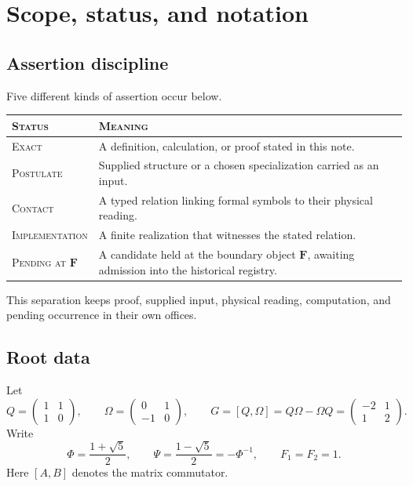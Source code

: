 \documentclass[10pt]{article}
\theoremstyle{remark}
\newcommand{\exact}{\textsc{Exact}}
\newcommand{\postulate}{\textsc{Postulate}}
\newcommand{\interface}{\textsc{Contact}}
\newcommand{\implementation}{\textsc{Implementation}}
\newcommand{\pending}{\textsc{Pending at $\mathbf F$}}
\begin{document}
\section{Scope, status, and notation}

\subsection{Assertion discipline}

Five different kinds of assertion occur below.

\begin{center}
\begin{tabular}{@{}L{3.15cm}L{9.5cm}@{}}
\toprule
\textsc{Status} & \textsc{Meaning}\\
\midrule
\exact & A definition, calculation, or proof stated in this note.\\
\postulate & Supplied structure or a chosen specialization carried as an input.\\
\interface & A typed relation linking formal symbols to their physical reading.\\
\implementation & A finite realization that witnesses the stated relation.\\
\pending & A candidate held at the boundary object $\mathbf F$, awaiting admission into the historical registry.\\
\bottomrule
\end{tabular}
\end{center}

This separation keeps proof, supplied input, physical reading, computation,
and pending occurrence in their own offices.

\subsection{Root data}

Let
\[
 Q=\begin{pmatrix}1&1\\1&0\end{pmatrix},\qquad
 \Omega=\begin{pmatrix}0&1\\-1&0\end{pmatrix},\qquad
 G=[Q,\Omega]=Q\Omega-\Omega Q
   =\begin{pmatrix}-2&1\\1&2\end{pmatrix}.
\tag{1}
\]
Write
\[
 \Phi=\frac{1+\sqrt5}{2},\qquad
 \Psi=\frac{1-\sqrt5}{2}=-\Phi^{-1},\qquad F_1=F_2=1.
\tag{2}
\]
Here $[A,B]$ denotes the matrix commutator.
\end{document}
